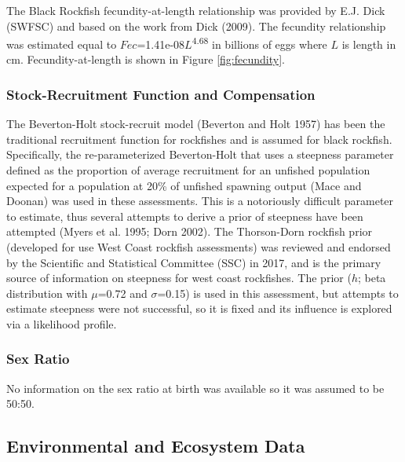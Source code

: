 \documentclass[11pt,
  letterpaper,
]{article}
\begin{document}
The Black Rockfish fecundity-at-length relationship was provided by E.J. Dick (SWFSC) and based on the work from Dick (2009). The fecundity relationship was estimated equal to \(Fec\)=1.41e-08\(L\)\textsuperscript{4.68} in billions of eggs where \(L\) is length in cm. Fecundity-at-length is shown in Figure \ref{fig:fecundity}.

\hypertarget{stock-recruitment-function-and-compensation}{%
\subsubsection{Stock-Recruitment Function and Compensation}\label{stock-recruitment-function-and-compensation}}

The Beverton-Holt stock-recruit model (Beverton and Holt 1957) has been the traditional recruitment function for rockfishes and is assumed for black rockfish. Specifically, the re-parameterized Beverton-Holt that uses a steepness parameter defined as the proportion of average recruitment for an unfished population expected for a population at 20\% of unfished spawning output (Mace and Doonan) was used in these assessments. This is a notoriously difficult parameter to estimate, thus several attempts to derive a prior of steepness have been attempted (Myers et al. 1995; Dorn 2002). The Thorson-Dorn rockfish prior (developed for use West Coast rockfish assessments) was reviewed and endorsed by the Scientific and Statistical Committee (SSC) in 2017, and is the primary source of information on steepness for west coast rockfishes. The prior (\(h\); beta distribution with \(\mu\)=0.72 and \(\sigma\)=0.15) is used in this assessment, but attempts to estimate steepness were not successful, so it is fixed and its influence is explored via a likelihood profile.

\hypertarget{sex-ratio}{%
\subsubsection{Sex Ratio}\label{sex-ratio}}

No information on the sex ratio at birth was available so it was assumed to be 50:50.

\hypertarget{environmental-and-ecosystem-data}{%
\subsection{Environmental and Ecosystem Data}\label{environmental-and-ecosystem-data}}
\end{document}
